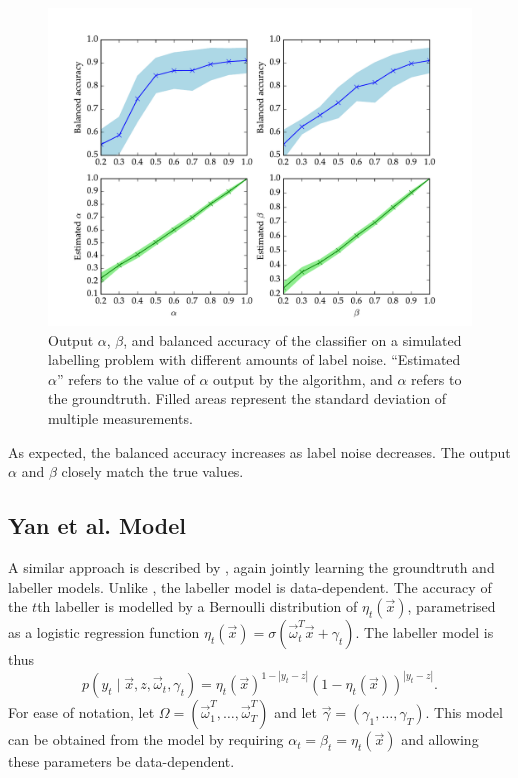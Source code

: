             \begin{figure}[!ht]
                \centering
                \includegraphics[width=\textwidth]
                    {images/experiments/raykar_noise}
                \caption{Output $\alpha$, $\beta$, and balanced accuracy of the
                    \citeauthor{raykar10} classifier on a simulated labelling
                    problem with different amounts of label noise. ``Estimated
                    $\alpha$'' refers to the value of $\alpha$ output by the
                    algorithm, and $\alpha$ refers to the groundtruth. Filled
                    areas represent the standard deviation of multiple
                    measurements.}
                \label{fig:raykar-noise}
            \end{figure}

            As expected, the balanced accuracy increases as label noise
            decreases. The output $\alpha$ and $\beta$ closely match the true
            values.

    \subsection{Yan et al. Model}
    \label{sec:yan}

        A similar approach is described by \citet{yan10}, again jointly learning
        the groundtruth and labeller models. Unlike \citeauthor{raykar10}, the
        \citeauthor{yan10} labeller model is data-dependent. The accuracy of the
        $t$th labeller is modelled by a Bernoulli distribution of $\eta_t(\vec
        x)$, parametrised as a logistic regression function $\eta_t(\vec x) =
        \sigma(\vec \omega_t^T \vec x + \gamma_t)$. The labeller model is thus
        \begin{equation*}
            p(y_t \mid \vec x, z, \vec \omega_t, \gamma_t) =
                \eta_t(\vec x)^{1 - |y_t - z|} (1 - \eta_t(\vec x))^{|y_t - z|}.
        \end{equation*}
        For ease of notation, let $\Omega = (\vec \omega_1^T, \dots,
        \vec \omega_T^T)$ and let $\vec \gamma = (\gamma_1, \dots, \gamma_T)$.
        This model can be obtained from the \citeauthor{raykar10} model by
        requiring $\alpha_t = \beta_t = \eta_t(\vec x)$ and allowing these
        parameters be data-dependent.


